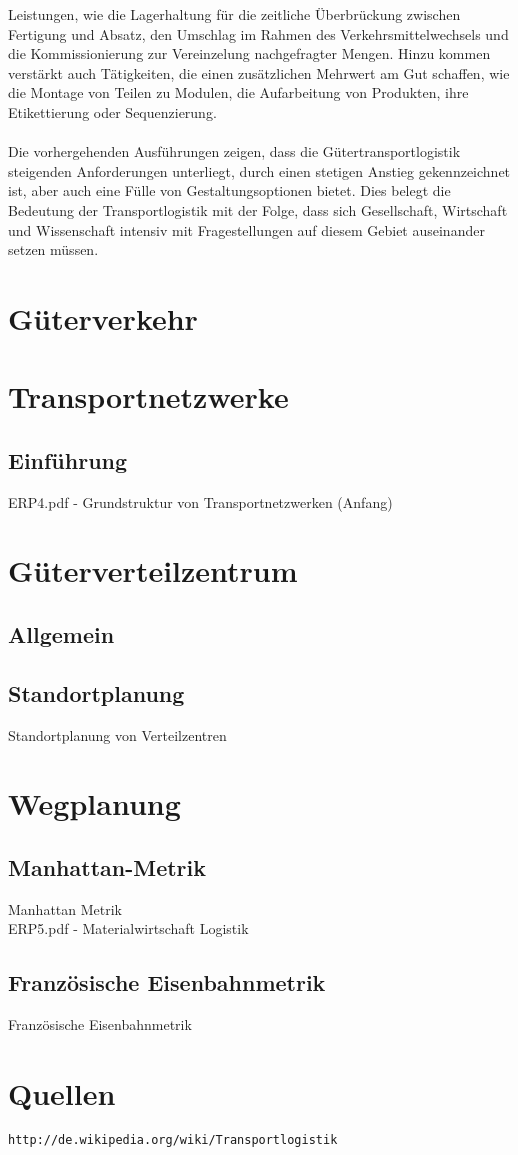 \documentclass[a4paper,12pt]{scrreprt}
\begin{document}
	Leistungen, wie die Lagerhaltung für die zeitliche Überbrückung zwischen Fertigung und
	Absatz, den Umschlag im Rahmen des Verkehrsmittelwechsels und die Kommissionierung
	zur Vereinzelung nachgefragter Mengen. Hinzu kommen verstärkt auch Tätigkeiten, die
	einen zusätzlichen Mehrwert am Gut schaffen, wie die Montage von Teilen zu Modulen,
	die Aufarbeitung von Produkten, ihre Etikettierung oder Sequenzierung.\\\\
	Die vorhergehenden Ausführungen zeigen, dass die Gütertransportlogistik steigenden
	Anforderungen unterliegt, durch einen stetigen Anstieg gekennzeichnet ist, aber auch eine
	Fülle von Gestaltungsoptionen bietet. Dies belegt die Bedeutung der Transportlogistik mit der Folge, dass sich Gesellschaft, Wirtschaft und Wissenschaft intensiv mit Fragestellungen auf diesem Gebiet auseinander setzen müssen.
	
	\chapter{Güterverkehr}
	
	
	\chapter{Transportnetzwerke}
	\section{Einführung}
	ERP4.pdf - Grundstruktur von Transportnetzwerken (Anfang)
	
	\chapter{Güterverteilzentrum}
	\section{Allgemein}
	
	\section{Standortplanung}
	Standortplanung von Verteilzentren
	
	\chapter{Wegplanung}
	\section{Manhattan-Metrik}
	Manhattan Metrik\\
	ERP5.pdf - Materialwirtschaft Logistik
	\section{Französische Eisenbahnmetrik}
		Französische Eisenbahnmetrik

	
\chapter{Quellen} 
\nolinkurl{http://de.wikipedia.org/wiki/Transportlogistik}
\end{document}
